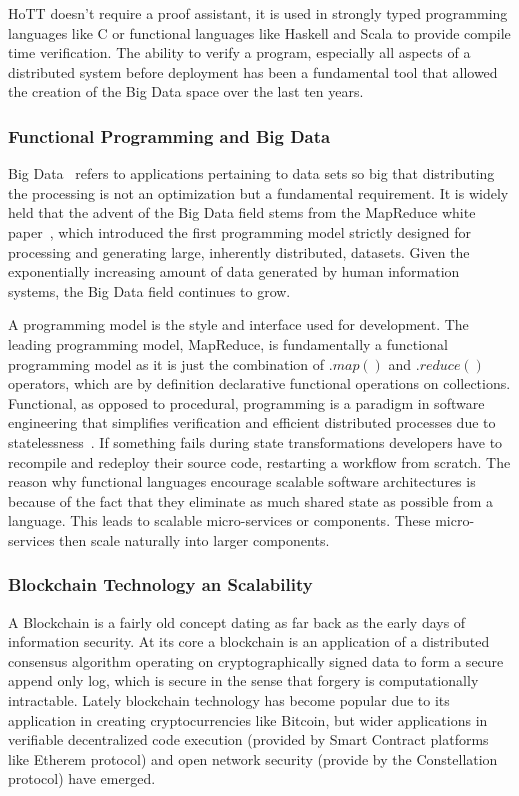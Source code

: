 \documentclass[runningheads]{llncs}
\begin{document}
HoTT doesn't require a proof assistant, it is used in strongly typed programming languages like C or functional languages like Haskell and Scala to provide compile time verification. The ability to verify a program, especially all aspects of a distributed system before deployment has been a fundamental tool that allowed the creation of the Big Data space over the last ten years.

\subsubsection{Functional Programming and Big Data}
Big Data~\cite{ref_article11,ref_book2} refers to applications pertaining to data sets so big that distributing the processing is not an optimization but a fundamental requirement. It is widely held that the advent of the Big Data field stems from the MapReduce white paper~\cite{ref_proc1}, which introduced the first programming model strictly designed for processing and generating large, inherently distributed, datasets. Given the exponentially increasing amount of data generated by human information systems, the Big Data field continues to grow.

A programming model is the style and interface used for development. The leading programming model, MapReduce, is fundamentally a functional programming model as it is just the combination of $.map()$ and $.reduce()$ operators, which are by definition declarative functional operations on collections. Functional, as opposed to procedural, programming is a paradigm in software engineering that simplifies verification and efficient distributed processes due to statelessness~\cite{ref_book3}. If something fails during state transformations developers have to recompile and redeploy their source code, restarting a workflow from scratch. The reason why functional languages encourage scalable software architectures is because of the fact that they eliminate as much shared state as possible from a language. This leads to scalable micro-services or components. These micro-services then scale naturally into larger components.

\subsubsection{Blockchain Technology an Scalability}
A Blockchain is a fairly old concept dating as far back as the early days of information security. At its core a blockchain is an application of a distributed consensus algorithm operating on cryptographically signed data to form a secure append only log, which is secure in the sense that forgery is computationally intractable. Lately blockchain technology has become popular due to its application in creating cryptocurrencies like Bitcoin, but wider applications in verifiable decentralized code execution (provided by Smart Contract platforms like Etherem protocol) and open network security (provide by the Constellation protocol) have emerged. 
\end{document}
